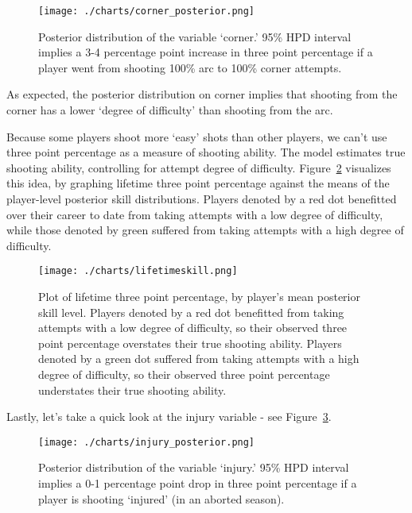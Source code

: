 \documentclass[11pt, oneside]{article}   	%
\begin{document}
\begin{figure}[h!]
  \centering
      \texttt{[image: ./charts/corner\_posterior.png]}
  \caption{Posterior distribution of the variable `corner.'  95\% HPD interval implies a 3-4 percentage point increase in three point percentage if a player went from shooting 100\% arc to 100\% corner attempts.}
  \label{fig:corner}
\end{figure}

As expected, the posterior distribution on corner implies that shooting from the corner has a lower `degree of difficulty' than shooting from the arc.  

Because some players shoot more `easy' shots than other players, we can't use three point percentage as a measure of shooting ability.  The model estimates true shooting ability, controlling for attempt degree of difficulty.   Figure~\ref{fig:lifetime} visualizes this idea, by graphing lifetime three point percentage against the means of the player-level posterior skill distributions.  Players denoted by a red dot benefitted over their career to date from taking attempts with a low degree of difficulty, while those denoted by green suffered from taking attempts with a high degree of difficulty.  

\begin{figure}[h!]
  \centering
      \texttt{[image: ./charts/lifetimeskill.png]}
  \caption{Plot of lifetime three point percentage, by player's mean posterior skill level.  Players denoted by a red dot benefitted from taking attempts with a low degree of difficulty, so their observed three point percentage overstates their true shooting ability. Players denoted by a green dot suffered from taking attempts with a high degree of difficulty, so their observed three point percentage understates their true shooting ability.}
    \label{fig:lifetime}
\end{figure}



Lastly, let's take a quick look at the injury variable - see Figure~\ref{fig:injury}.

\begin{figure}[h!]
 \centering
      \texttt{[image: ./charts/injury\_posterior.png]}
  \caption{Posterior distribution of the variable `injury.'  95\% HPD interval implies a 0-1 percentage point drop in three point percentage if a player is shooting `injured' (in an aborted season). }
  \label{fig:injury}
\end{figure}
\end{document}
